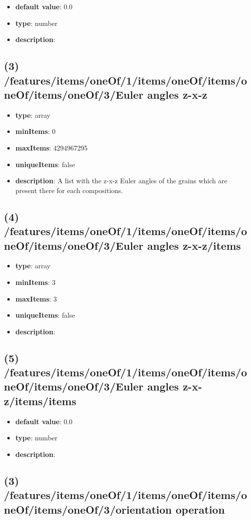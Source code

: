 \begin{itemize}[leftmargin=6em]\item {\bf default value}: 0.0
\item {\bf type}: number
\item {\bf description}: 
\end{itemize}\subsection{(3) /features/items/oneOf/1/items/oneOf/items/oneOf/items/oneOf/3/Euler angles z-x-z}
\begin{itemize}[leftmargin=3em]\item {\bf type}: array
\item {\bf minItems}: 0
\item {\bf maxItems}: 4294967295
\item {\bf uniqueItems}: false
\item {\bf description}: A list with the z-x-z Euler angles of the grains which are present there for each compositions.
\end{itemize}\subsection{(4) /features/items/oneOf/1/items/oneOf/items/oneOf/items/oneOf/3/Euler angles z-x-z/items}
\begin{itemize}[leftmargin=4em]\item {\bf type}: array
\item {\bf minItems}: 3
\item {\bf maxItems}: 3
\item {\bf uniqueItems}: false
\item {\bf description}: 
\end{itemize}\subsection{(5) /features/items/oneOf/1/items/oneOf/items/oneOf/items/oneOf/3/Euler angles z-x-z/items/items}
\begin{itemize}[leftmargin=5em]\item {\bf default value}: 0.0
\item {\bf type}: number
\item {\bf description}: 
\end{itemize}\subsection{(3) /features/items/oneOf/1/items/oneOf/items/oneOf/items/oneOf/3/orientation operation}

